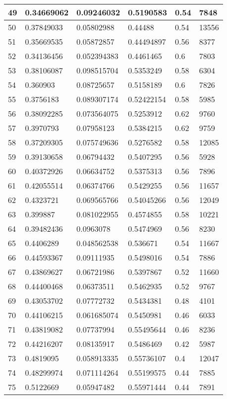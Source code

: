 \begin{longtable}{|l|l|l|l|l|l|}
49 & 0.34669062 & 0.09246032 & 0.5190583 & 0.54 & 7848 \\ \hline 
50 & 0.37849033 & 0.05802988 & 0.44488 & 0.54 & 13556 \\ \hline 
51 & 0.35669535 & 0.05872857 & 0.44494897 & 0.56 & 8377 \\ \hline 
52 & 0.34136456 & 0.052394383 & 0.4461465 & 0.6 & 7803 \\ \hline 
53 & 0.38106087 & 0.098515704 & 0.5353249 & 0.58 & 6304 \\ \hline 
54 & 0.360903 & 0.08725657 & 0.5158189 & 0.6 & 7826 \\ \hline 
55 & 0.3756183 & 0.089307174 & 0.52422154 & 0.58 & 5985 \\ \hline 
56 & 0.38092285 & 0.073564075 & 0.5253912 & 0.62 & 9760 \\ \hline 
57 & 0.3970793 & 0.07958123 & 0.5384215 & 0.62 & 9759 \\ \hline 
58 & 0.37209305 & 0.075749636 & 0.5276582 & 0.58 & 12085 \\ \hline 
59 & 0.39130658 & 0.06794432 & 0.5407295 & 0.56 & 5928 \\ \hline 
60 & 0.40372926 & 0.06634752 & 0.5375313 & 0.56 & 7896 \\ \hline 
61 & 0.42055514 & 0.06374766 & 0.5429255 & 0.56 & 11657 \\ \hline 
62 & 0.4323721 & 0.069565766 & 0.54045266 & 0.56 & 12049 \\ \hline 
63 & 0.399887 & 0.081022955 & 0.4574855 & 0.58 & 10221 \\ \hline 
64 & 0.39482436 & 0.0963078 & 0.5474969 & 0.56 & 8230 \\ \hline 
65 & 0.4406289 & 0.048562538 & 0.536671 & 0.54 & 11667 \\ \hline 
66 & 0.44593367 & 0.09111935 & 0.5498016 & 0.54 & 7886 \\ \hline 
67 & 0.43869627 & 0.06721986 & 0.5397867 & 0.52 & 11660 \\ \hline 
68 & 0.44400468 & 0.06373511 & 0.5462935 & 0.52 & 9767 \\ \hline 
69 & 0.43053702 & 0.07772732 & 0.5434381 & 0.48 & 4101 \\ \hline 
70 & 0.44106215 & 0.061685074 & 0.5450981 & 0.46 & 6033 \\ \hline 
71 & 0.43819082 & 0.07737994 & 0.55495644 & 0.46 & 8236 \\ \hline 
72 & 0.44216207 & 0.08135917 & 0.5486469 & 0.42 & 5987 \\ \hline 
73 & 0.4819095 & 0.058913335 & 0.55736107 & 0.4 & 12047 \\ \hline 
74 & 0.48299974 & 0.071114264 & 0.55199575 & 0.44 & 7885 \\ \hline 
75 & 0.5122669 & 0.05947482 & 0.55971444 & 0.44 & 7891 \\ \hline 
\end{longtable}
